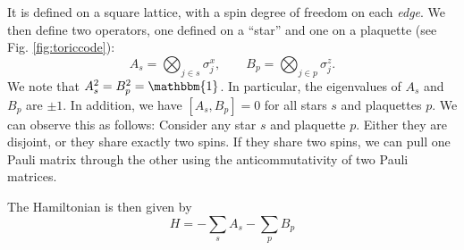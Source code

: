 \documentclass[prb,11pt, nofootinbib]{revtex4-2}
\theoremstyle{definition}
\theoremstyle{definition}
\theoremstyle{definition}
\theoremstyle{definition}
\begin{document}
 It is defined on a square lattice, with a spin degree of freedom on each \emph{edge}. We then define two operators, one defined on a ``star'' and one on a plaquette (see Fig. \ref{fig:toriccode}):
\[
	A_s = \bigotimes_{j\in s}\sigma_j^x,\qquad B_p = \bigotimes_{j\in p}\sigma_j^z
.\] 
We note that $A_s^2 = B_p^2 = \mathbbm{1}$. In particular, the eigenvalues of $A_s$ and $B_p$ are $\pm 1$. In addition, we have $[A_s,B_p]=0$ for all stars $s$ and plaquettes $p$. We can observe this as follows: Consider any star $s$ and plaquette $p$. Either they are disjoint, or they share exactly two spins. If they share two spins, we can pull one Pauli matrix through the other using the anticommutativity of two Pauli matrices.

The Hamiltonian is then given by
\[H = -\sum_s A_s - \sum_p B_p\]
\end{document}
